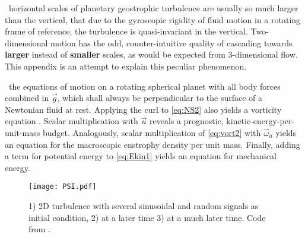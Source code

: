 \label{chap:turbu_categories}
~horizontal scales of planetary geostrophic turbulence are usually so much
larger than the vertical, that due to the gyroscopic rigidity of fluid motion
in a rotating frame of reference, the turbulence is quasi-invariant in
the vertical. Two-dimensional motion has the odd, counter-intuitive quality of
cascading towards \textbf{larger} instead of \textbf{smaller} scales, as would be
expected from 3-dimensional flow. This appendix is an attempt to explain
this peculiar phenomenon.


~the equations of motion on a rotating spherical planet with all body forces
combined in $\vec{g}$, which shall always be perpendicular to
the surface of a Newtonian fluid at rest. Applying the curl to \eqref{eq:NS2}
also yields a vorticity equation .
Scalar multiplication with $\vec{u}$ reveals a prognostic, kinetic-energy-per-unit-mass budget.
Analogously, scalar multiplication of \eqref{eq:vort2} with $\vec{\omega}_{a}$ yields an equation
for the macroscopic enstrophy density per unit mass. Finally, adding a term for potential energy to \eqref{eq:Ekin1} yields an equation for mechanical energy.

\begin{figure}
\texttt{[image: PSI.pdf]}
\caption{1) 2D turbulence with several sinusoidal and random signals as initial condition, 2) at a later time 3) at a much later time. Code from
\citet{Seibold2008a}.}
\label{fig:PSI}
\end{figure}


